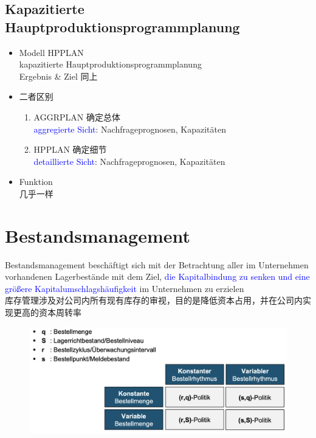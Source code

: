 \documentclass[12pt, letterpaper]{article}
\begin{document}
\begin{CJK*}{UTF8}{gbsn}
\begin{itemize}
\begin{itemize}
\end{itemize}


\end{itemize}

\subsection{Kapazitierte Hauptproduktionsprogrammplanung}
\begin{itemize}
\item Modell HPPLAN\\
kapazitierte Hauptproduktionsprogrammplanung\\
Ergebnis \& Ziel 同上

\item 二者区别
\begin{enumerate}
\item AGGRPLAN 确定总体\\
\textcolor{blue}{aggregierte Sicht}: Nachfrageprognosen, Kapazitäten

\item HPPLAN 确定细节\\
\textcolor{blue}{detaillierte Sicht}: Nachfrageprognosen, Kapazitäten
\end{enumerate}

\item Funktion\\
几乎一样


\end{itemize}







\newpage
\section{Bestandsmanagement}
Bestandsmanagement beschäftigt sich mit der Betrachtung aller im Unternehmen vorhandenen Lagerbestände mit dem Ziel, \textcolor{blue}{die Kapitalbindung zu senken und eine größere Kapitalumschlagshäufigkeit} im Unternehmen zu erzielen\\[1mm]
库存管理涉及对公司内所有现有库存的审视，目的是降低资本占用，并在公司内实现更高的资本周转率\\

\begin{figure}[h!]
  \centering %
  \includegraphics[width=0.8\linewidth]{VL71.png}
\end{figure}


\end{CJK*}
\end{document}
